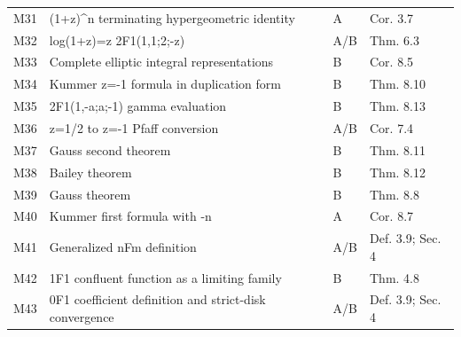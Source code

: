 \begin{longtable}{@{}p{}p{}p{}p{}@{}}
M31 & (1+z)\textasciicircum{}n terminating hypergeometric identity & \textsf{A} & Cor. 3.7 \\
M32 & log(1+z)=z 2F1(1,1;2;-z) & \textsf{A/B} & Thm. 6.3 \\
M33 & Complete elliptic integral representations & \textsf{B} & Cor. 8.5 \\
M34 & Kummer z=-1 formula in duplication form & \textsf{B} & Thm. 8.10 \\
M35 & 2F1(1,-a;a;-1) gamma evaluation & \textsf{B} & Thm. 8.13 \\
M36 & z=1/2 to z=-1 Pfaff conversion & \textsf{A/B} & Cor. 7.4 \\
M37 & Gauss second theorem & \textsf{B} & Thm. 8.11 \\
M38 & Bailey theorem & \textsf{B} & Thm. 8.12 \\
M39 & Gauss theorem & \textsf{B} & Thm. 8.8 \\
M40 & Kummer first formula with -n & \textsf{A} & Cor. 8.7 \\
M41 & Generalized nFm definition & \textsf{A/B} & Def. 3.9; Sec. 4 \\
M42 & 1F1 confluent function as a limiting family & \textsf{B} & Thm. 4.8 \\
M43 & 0F1 coefficient definition and strict-disk convergence & \textsf{A/B} & Def. 3.9; Sec. 4 \\
\end{longtable}
